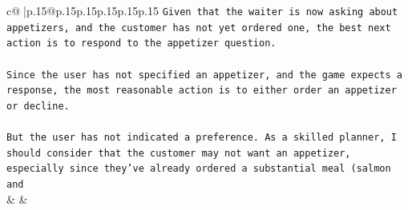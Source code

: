 \documentclass{article}
\begin{document}
{\begin{supertabular}{c@{$\;$}|p{.15\linewidth}@{}p{.15\linewidth}p{.15\linewidth}p{.15\linewidth}p{.15\linewidth}p{.15\linewidth}}
{{{\texttt{Given that the waiter is now asking about appetizers, and the customer has not yet ordered one, the best next action is to respond to the appetizer question.} \\
\\ 
\texttt{Since the user has not specified an appetizer, and the game expects a response, the most reasonable action is to either order an appetizer or decline.} \\
\\ 
\texttt{But the user has not indicated a preference. As a skilled planner, I should consider that the customer may not want an appetizer, especially since they've already ordered a substantial meal (salmon and} \\
            }
        }
    }
    & & \\ \\


\end{supertabular}}
\end{document}
